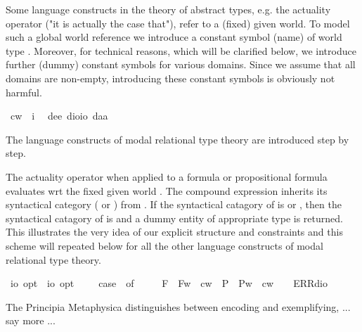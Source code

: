 \begin{isabellebody}
\begin{isamarkuptext}%
Some language constructs in the theory of abstract types, e.g. the actuality operator  
 \isa{{\isasymA}} ("it is actually the case that"), refer to a (fixed) given world. To model such a 
 global world reference we introduce a
 constant symbol (name)  of world type . Moreover, for technical reasons, 
 which will be clarified below, we introduce further (dummy) constant symbols for various domains. Since
 we assume that all domains are non-empty, introducing these constant symbols is obviously not harmful.%
\end{isamarkuptext}%
\isamarkuptrue%
\isamarkupfalse%
\ cw\ {\isacharcolon}{\isacharcolon}\ i\ \isanewline
{}\isamarkupfalse%
\ de{\isacharcolon}{\isacharcolon}{\isachardoublequoteopen}e{\isachardoublequoteclose}\ dio{\isacharcolon}{\isacharcolon}{\isachardoublequoteopen}io{\isachardoublequoteclose}\ da{\isacharcolon}{\isacharcolon}{\isacharprime}a%
\isamarkuptrue%
%
\begin{isamarkuptext}%
The language constructs of modal relational type theory are introduced step by step.%
\end{isamarkuptext}%
\isamarkuptrue%
%
\begin{isamarkuptext}%
The actuality operator \isa{{\isasymA}} when applied to a formula or propositional formula 
 \isa{{\isasymphi}} evaluates \isa{{\isasymphi}} wrt the fixed given world . 
 The compound expression \isa{{\isasymA}\ {\isasymphi}} inherits its syntactical category  ( or
 ) from \isa{{\isasymphi}}. If the syntactical catagory of  \isa{{\isasymphi}} is 
  or , then the syntactical catagory of \isa{{\isasymA}\ {\isasymphi}} 
 is  and a dummy entity of appropriate type is returned. This illustrates the very 
 idea of our explicit structure and constraints and this scheme will repeated below
 for all the other language constructs of modal relational type theory.%
\end{isamarkuptext}%
\isamarkuptrue%
\isamarkupfalse%
\ {\isasymA}{\isacharcolon}{\isacharcolon}{\isachardoublequoteopen}io\ opt\ {\isasymRightarrow}\ io\ opt{\isachardoublequoteclose}\ \ {\isachardoublequoteopen}{\isasymA}\ {\isasymphi}\ {\isasymequiv}\ case\ {\isasymphi}\ of\ \isanewline
\ \ \ \ F{\isacharparenleft}{\isasympsi}{\isacharparenright}\ {\isasymRightarrow}\ F{\isacharparenleft}{\isasymlambda}w{\isachardot}\ {\isasympsi}\ cw{\isacharparenright}\ {\isacharbar}\ P{\isacharparenleft}{\isasympsi}{\isacharparenright}\ {\isasymRightarrow}\ P{\isacharparenleft}{\isasymlambda}w{\isachardot}\ {\isasympsi}\ cw{\isacharparenright}\ {\isacharbar}\ {\isacharunderscore}\ {\isasymRightarrow}\ ERR{\isacharparenleft}dio{\isacharparenright}{\isachardoublequoteclose}%
\begin{isamarkuptext}%
The Principia Metaphysica distinguishes between encoding and exemplifying, ... say more ...


\end{isamarkuptext}
\end{isabellebody}
